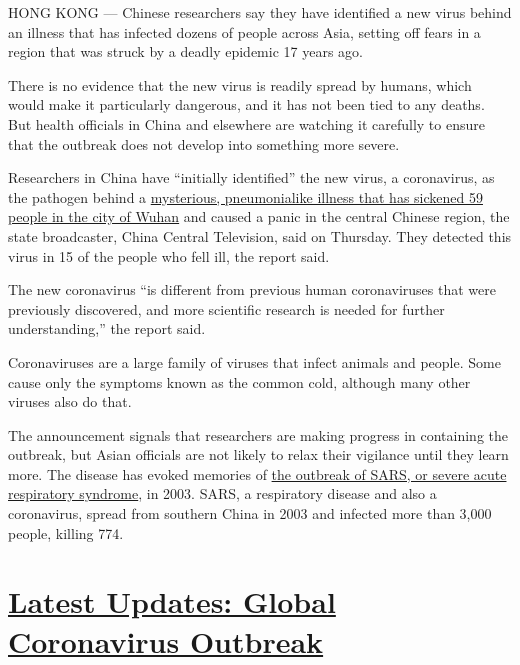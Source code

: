 HONG KONG --- Chinese researchers say they have identified a new virus
behind an illness that has infected dozens of people across Asia,
setting off fears in a region that was struck by a deadly epidemic 17
years ago.

There is no evidence that the new virus is readily spread by humans,
which would make it particularly dangerous, and it has not been tied to
any deaths. But health officials in China and elsewhere are watching it
carefully to ensure that the outbreak does not develop into something
more severe.

Researchers in China have ``initially identified'' the new virus, a
coronavirus, as the pathogen behind a
\href{https://www.nytimes.com/2020/01/06/world/asia/china-SARS-pneumonialike.html}{mysterious,
pneumonialike illness that has sickened 59 people in the city of Wuhan}
and caused a panic in the central Chinese region, the state broadcaster,
China Central Television, said on Thursday. They detected this virus in
15 of the people who fell ill, the report said.

The new coronavirus ``is different from previous human coronaviruses
that were previously discovered, and more scientific research is needed
for further understanding,'' the report said.

Coronaviruses are a large family of viruses that infect animals and
people. Some cause only the symptoms known as the common cold, although
many other viruses also do that.

The announcement signals that researchers are making progress in
containing the outbreak, but Asian officials are not likely to relax
their vigilance until they learn more. The disease has evoked memories
of
\href{https://www.nytimes.com/2003/04/27/world/the-sars-epidemic-the-path-from-china-s-provinces-a-crafty-germ-breaks-out.html}{the
outbreak of SARS, or severe acute respiratory syndrome}, in 2003. SARS,
a respiratory disease and also a coronavirus, spread from southern China
in 2003 and infected more than 3,000 people, killing 774.

\hypertarget{latest-updates-global-coronavirus-outbreak}{%
\section{\texorpdfstring{\href{https://www.nytimes.com/2020/08/01/world/coronavirus-covid-19.html?action=click\&pgtype=Article\&state=default\&region=MAIN_CONTENT_1\&context=storylines_live_updates}{Latest
Updates: Global Coronavirus
Outbreak}}{Latest Updates: Global Coronavirus Outbreak}}\label{latest-updates-global-coronavirus-outbreak}}

